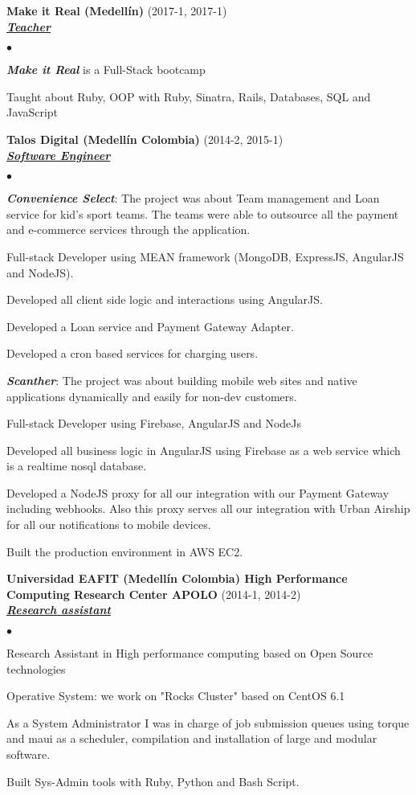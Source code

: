 \documentclass[a4paper]{article}
\newcommand{\employer}[3]{{
\textbf{#1} (#2)\\ \underline{\textbf{\emph{#3}}}\\ }}
\newenvironment{achievements}{\begin{list}{$\bullet$}{\topsep 0pt \itemsep
-2pt}}{\vspace*{4pt}\end{list}}
\newcommand{\emphasys}[1]{\textbf{\emph{#1}}}
\begin{document}
\employer{Make it Real (Medell\'in)}{2017-1, 2017-1}{Teacher}
\begin{achievements}
\item \emphasys{Make it Real} is a Full-Stack bootcamp
\item Taught about Ruby, OOP with Ruby, Sinatra, Rails, Databases, SQL and JavaScript
\end{achievements}

\employer{ Talos Digital (Medell\'in Colombia)}{2014-2, 2015-1}{Software Engineer}
\begin{achievements}
\item \emphasys{Convenience Select}: The project was about Team management and Loan service for kid's sport teams. The teams were able to outsource all the payment and e-commerce services through the application.
\item Full-stack Developer using MEAN framework  (MongoDB, ExpressJS, AngularJS and NodeJS).
\item Developed all client side logic and interactions using AngularJS.
\item Developed a Loan service and Payment Gateway Adapter.
\item Developed a cron based services for charging users.
\item \emphasys{Scanther}: The project was about building mobile web sites and native applications dynamically and easily for non-dev customers.
\item Full-stack Developer using Firebase, AngularJS and NodeJs
\item Developed all business logic in AngularJS using Firebase as a web service which is a realtime nosql database.
\item Developed a NodeJS proxy for all our integration with our Payment Gateway including webhooks. Also this proxy serves all our integration with Urban Airship for all our notifications to mobile devices.
\item Built the production environment in AWS EC2.
\end{achievements}

\employer{ Universidad EAFIT (Medell\'in Colombia) High Performance Computing Research Center APOLO}{2014-1, 2014-2}{Research assistant}
\begin{achievements}
\item Research Assistant in High performance computing based on Open Source technologies
\item Operative System: we work on "Rocks Cluster" based on CentOS 6.1
\item As a System Administrator I was in charge of job submission queues using torque and maui as a scheduler, compilation and installation of large and modular software.
\item Built Sys-Admin tools with Ruby, Python and Bash Script.
\end{achievements}
\end{document}
